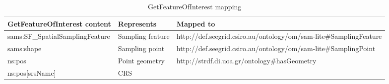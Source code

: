\begin{sidewaystable}[!htbp]
	\centering
	\caption{GetFeatureOfInterest mapping}
	\label{map:getFOI}
		\begin{tabular}{l|l|l}
			GetFeatureOfInterest content    & Represents       & Mapped to                                                         \\ \hline
			sams:SF\_SpatialSamplingFeature & Sampling feature & http://def.seegrid.csiro.au/ontology/om/sam-lite\#SamplingFeature \\
			sams:shape                      & Sampling point   & http://def.seegrid.csiro.au/ontology/om/sam-lite\#SamplingPoint   \\
			ns:pos                          & Point geometry   & \multirow{2}{*}{http://strdf.di.uoa.gr/ontology\#hasGeometry}     \\
			ns:pos{[}srsName{]}             & CRS              &                                                                  
		\end{tabular}
\end{sidewaystable}

